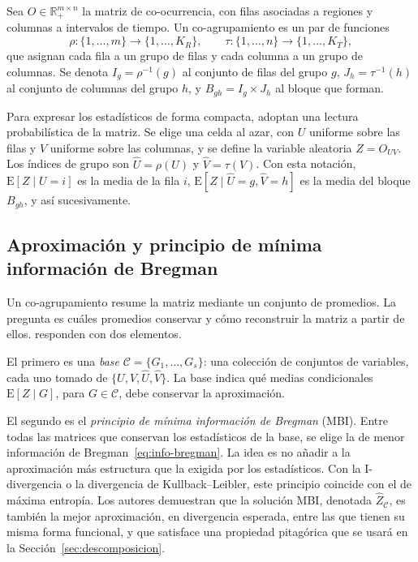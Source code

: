 Sea $O \in \mathbb{R}_{+}^{m \times n}$ la matriz de co-ocurrencia, con filas
asociadas a regiones y columnas a intervalos de tiempo. Un co-agrupamiento es un
par de funciones
\[
  \rho : \{1, \dots, m\} \to \{1, \dots, K_R\}, \qquad
  \tau : \{1, \dots, n\} \to \{1, \dots, K_T\},
\]
que asignan cada fila a un grupo de filas y cada columna a un grupo de columnas.
Se denota $I_g = \rho^{-1}(g)$ al conjunto de filas del grupo $g$,
$J_h = \tau^{-1}(h)$ al conjunto de columnas del grupo $h$, y
$B_{gh} = I_g \times J_h$ al bloque que forman.

Para expresar los estadísticos de forma compacta, \cite{Banerjee2007} adoptan una
lectura probabilística de la matriz. Se elige una celda al azar, con $U$ uniforme
sobre las filas y $V$ uniforme sobre las columnas, y se define la variable
aleatoria $Z = O_{UV}$. Los índices de grupo son $\hat{U} = \rho(U)$ y
$\hat{V} = \tau(V)$. Con esta notación, $\mathrm{E}[Z \mid U = i]$ es la media de
la fila $i$, $\mathrm{E}[Z \mid \hat{U} = g, \hat{V} = h]$ es la media del bloque
$B_{gh}$, y así sucesivamente.

\subsection{Aproximación y principio de mínima información de Bregman}

Un co-agrupamiento resume la matriz mediante un conjunto de promedios. La pregunta
es cuáles promedios conservar y cómo reconstruir la matriz a partir de ellos.
\cite{Banerjee2007} responden con dos elementos.

El primero es una \emph{base} $\mathcal{C} = \{G_1, \dots, G_s\}$: una colección de
conjuntos de variables, cada uno tomado de $\{U, V, \hat{U}, \hat{V}\}$. La base
indica qué medias condicionales $\mathrm{E}[Z \mid G]$, para $G \in \mathcal{C}$,
debe conservar la aproximación.

El segundo es el \emph{principio de mínima información de Bregman} (MBI). Entre
todas las matrices que conservan los estadísticos de la base, se elige la de menor
información de Bregman~\eqref{eq:info-bregman}. La idea es no añadir a la
aproximación más estructura que la exigida por los estadísticos. Con la
I-divergencia o la divergencia de Kullback--Leibler, este principio coincide con el
de máxima entropía. Los autores demuestran que la solución MBI, denotada
$\hat{Z}_{\mathcal{C}}$, es también la mejor aproximación, en divergencia esperada,
entre las que tienen su misma forma funcional, y que satisface una propiedad
pitagórica \cite[Lema~3 y Teorema~2]{Banerjee2007} que se usará en la
Sección~\ref{sec:descomposicion}.

